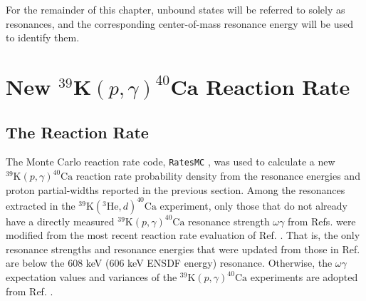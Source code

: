 For the remainder of this chapter, unbound states will be referred to solely as resonances, and the corresponding center-of-mass resonance energy will be used to identify them.

\section{New $^{39}\mathrm{\textbf{K}}(p,\gamma)^{40}\mathrm{\textbf{Ca}}$ Reaction Rate} \label{sec:pg_reac_rate}

\subsection{The Reaction Rate}

The Monte Carlo reaction rate code, \texttt{RatesMC} \cite{Longland2010a,RatesMC}, was used to calculate a new $^{39}\mathrm{K}(p, \gamma)^{40}\mathrm{Ca}$ reaction rate probability density from the resonance energies and proton partial-widths reported in the previous section. Among the resonances extracted in the $^{39}\mathrm{K}(^{3}\mathrm{He},d)^{40}\mathrm{Ca}$ experiment, only those that do not already have a directly measured $^{39}\mathrm{K}(p, \gamma)^{40}\mathrm{Ca}$ resonance strength $\omega \gamma$ from Refs. \cite{Kikstra1990,Cheng1981,Leenhouts1966} were modified from the most recent reaction rate evaluation of Ref. \cite{Longland2018}. That is, the only resonance strengths and resonance energies that were updated from those in Ref. \cite{Longland2018} are below the 608 keV (606 keV ENSDF energy) resonance. Otherwise, the $\omega \gamma$ expectation values and variances of the $^{39}\mathrm{K}(p, \gamma)^{40}\mathrm{Ca}$ experiments \cite{Kikstra1990,Cheng1981,Leenhouts1966} are adopted from Ref. \cite{Longland2018}.

